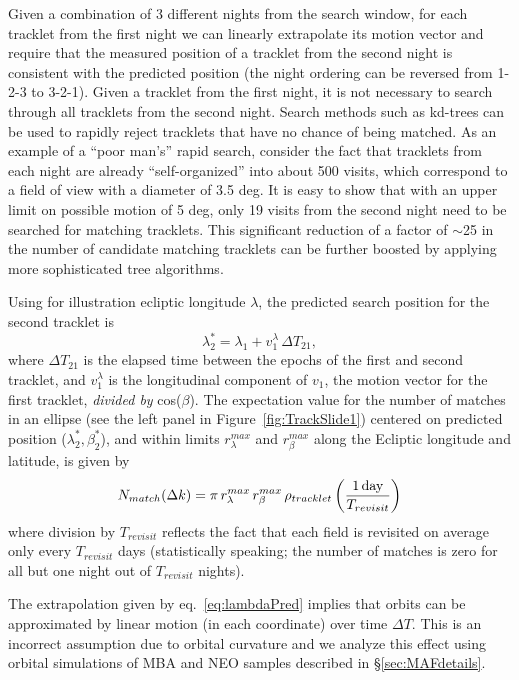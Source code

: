 Given a combination of 3 different nights from the search window, for each tracklet
from the first night we can linearly extrapolate its motion vector and require that the
measured  position of a tracklet from the second night is consistent with the predicted
position (the night ordering can be reversed from 1-2-3 to 3-2-1). Given a tracklet from
the first night, it is not necessary to search through all tracklets from the second night.
Search methods such as kd-trees can be used to rapidly reject tracklets that have no
chance of being matched. As an example of a ``poor man's'' rapid search, consider the
fact that tracklets from each night are already ``self-organized'' into about 500 visits,
which correspond to a field of view with a diameter of 3.5 deg. It is easy to show that with
an upper limit on possible motion of 5 deg, only 19 visits from the second night need to be
searched for matching  tracklets. This significant reduction of a factor of $\sim$25 in
the number of candidate matching tracklets can be further boosted by applying more
sophisticated tree algorithms.

Using for illustration ecliptic longitude $\lambda$, the predicted search position for the
second tracklet is
\begin{equation}
\label{eq:lambdaPred}
               \lambda_2^\ast = \lambda_1 + v_1^\lambda \, \Delta T_{21},
\end{equation}
where $\Delta T_{21}$ is the elapsed time between the epochs of the first and second tracklet,
and $v_1^\lambda$ is the longitudinal component of $v_1$, the motion vector for the first
tracklet, {\it divided by} cos($\beta$). The expectation value for the number of matches in
an ellipse (see the left panel in Figure~\ref{fig:TrackSlide1})
centered on predicted position ($\lambda_2^\ast, \beta_2^\ast$), and within limits $r_\lambda^{max}$
and  $r_\beta^{max}$ along the Ecliptic longitude and latitude, is given by
\begin{equation}
\label{eq:Nmdk}
     N_{match}(\Delta k) = \pi \, r_\lambda^{max} \, r_\beta^{max}  \, \rho_{tracklet} \left({1 \, {\rm day} \over T_{revisit}}\right)
\end{equation}
where division by $T_{revisit}$ reflects the fact that each field is revisited on average only
every $T_{revisit}$ days (statistically speaking; the number of matches is zero for all but one
night out of $T_{revisit}$ nights).

The extrapolation given by eq.~\ref{eq:lambdaPred} implies that orbits can be approximated by
linear motion (in each coordinate) over time $\Delta T$. This is an incorrect assumption
due to orbital curvature and we analyze this effect using orbital simulations of MBA and NEO
samples described in \S\ref{sec:MAFdetails}.

